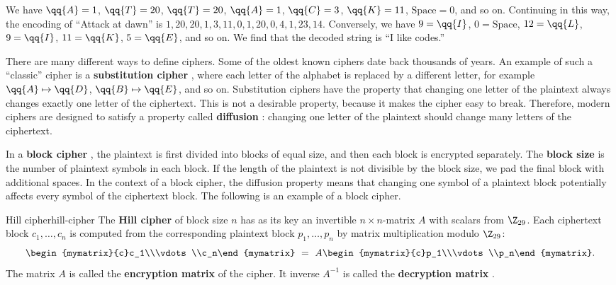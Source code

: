 \begin{solution}
  We have $\qq{A}=1$, $\qq{T}=20$, $\qq{T}=20$, $\qq{A}=1$, $\qq{C}=3$,
  $\qq{K}=11$, $\mbox{Space}=0$, and so on. Continuing in this way, the
  encoding of ``Attack at dawn'' is
  $1,20,20,1,3,11,0,1,20,0,4,1,23,14$.  Conversely, we have $9=\qq{I}$,
  $0=\mbox{Space}$, $12=\qq{L}$, $9=\qq{I}$, $11=\qq{K}$, $5=\qq{E}$, and so
  on. We find that the decoded string is ``I like codes.''
\end{solution}

There are many different ways to define ciphers. Some of the oldest
known ciphers date back thousands of years.  An example of such a
``classic'' cipher is a \textbf{substitution cipher}%
%
, where each letter of the alphabet
is replaced by a different letter, for example $\qq{A}\mapsto\qq{D}$,
$\qq{B}\mapsto\qq{E}$, and so on. Substitution ciphers have the property
that changing one letter of the plaintext always changes exactly one
letter of the ciphertext. This is not a desirable property, because it
makes the cipher easy to break. Therefore, modern ciphers are designed
to satisfy a property called \textbf{diffusion}%
%
: changing one letter of the plaintext should
change many letters of the ciphertext.

In a \textbf{block cipher}%
%
, the plaintext is first divided into
blocks of equal size, and then each block is encrypted separately. The
\textbf{block size}%
 is the number of plaintext symbols in each
block. If the length of the plaintext is not divisible by the block
size, we pad the final block with additional spaces. In the context of
a block cipher, the diffusion property means that changing one symbol
of a plaintext block potentially affects every symbol of the
ciphertext block. The following is an example of a block cipher.

\begin{definition}{Hill cipher}{hill-cipher}
  The \textbf{Hill cipher}%
   of block size $n$ has as its key an
  invertible $n\times n$-matrix $A$ with scalars from $\Z_{29}$. Each
  ciphertext block $c_1,\ldots,c_n$ is computed from the corresponding
  plaintext block $p_1,\ldots,p_n$ by matrix multiplication modulo
  $\Z_{29}$:
  \begin{equation*}
    \begin{mymatrix}{c}c_1\\\vdots\\c_n\end{mymatrix}
    ~=~ A\begin{mymatrix}{c}p_1\\\vdots\\p_n\end{mymatrix}.
  \end{equation*}
  The matrix $A$ is called the \textbf{encryption matrix}%
   of the cipher. It inverse $A^{-1}$ is
  called the \textbf{decryption matrix}%
  .
\end{definition}

